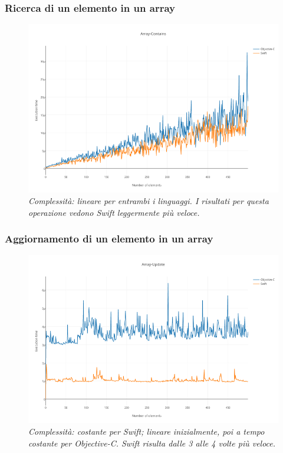 \subsubsection{Ricerca di un elemento in un array}
\begin{figure}[H]
      \centering
      \includegraphics[scale=0.50]{immagini/array_contains.png}
            \vspace{0.8cm}
            \caption{\textit{Complessità: lineare per entrambi i linguaggi. I risultati per questa operazione vedono Swift leggermente più veloce.}}
\end{figure}
\subsubsection{Aggiornamento di un elemento in un array}
\begin{figure}[H]
      \centering
      \includegraphics[scale=0.50]{immagini/array_update.png}
            \vspace{0.8cm}
            \caption{\textit{Complessità: costante per Swift; lineare inizialmente, poi a tempo costante per Objective-C. Swift risulta dalle 3 alle 4 volte più veloce.}}
\end{figure}
